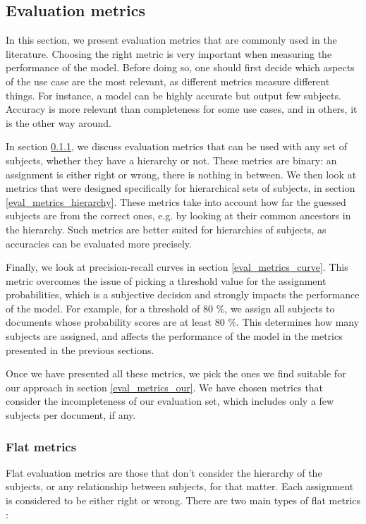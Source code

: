 \subsection{Evaluation metrics} \label{eval_metrics}

In this section, we present evaluation metrics that are commonly used in the literature. Choosing the right metric is very important when measuring the performance of the model. Before doing so, one should first decide which aspects of the use case are the most relevant, as different metrics measure different things. For instance, a model can be highly accurate but output few subjects. Accuracy is more relevant than completeness for some use cases, and in others, it is the other way around.

In section \ref{eval_metrics_flat}, we discuss evaluation metrics that can be used with any set of subjects, whether they have a hierarchy or not. These metrics are binary: an assignment is either right or wrong, there is nothing in between. We then look at metrics that were designed specifically for hierarchical sets of subjects, in section \ref{eval_metrics_hierarchy}. These metrics take into account how far the guessed subjects are from the correct ones, e.g. by looking at their common ancestors in the hierarchy. Such metrics are better suited for hierarchies of subjects, as accuracies can be evaluated more precisely.

Finally, we look at precision-recall curves in section \ref{eval_metrics_curve}. This metric overcomes the issue of picking a threshold value for the assignment probabilities, which is a subjective decision and strongly impacts the performance of the model. For example, for a threshold of 80 \%, we assign all subjects to documents whose probability scores are at least 80 \%. This determines how many subjects are assigned, and affects the performance of the model in the metrics presented in the previous sections.

Once we have presented all these metrics, we pick the ones we find suitable for our approach in section \ref{eval_metrics_our}. We have chosen metrics that consider the incompleteness of our evaluation set, which includes only a few subjects per document, if any.

\subsubsection{Flat metrics} \label{eval_metrics_flat}

Flat evaluation metrics are those that don't consider the hierarchy of the subjects, or any relationship between subjects, for that matter. Each assignment is considered to be either right or wrong. There are two main types of flat metrics \cite{giraldo2015evaluation}:

